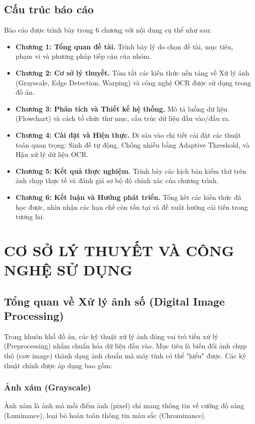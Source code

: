 \documentclass[6pt, a4paper]{report}
\begin{document}
	\section{Cấu trúc báo cáo}
	Báo cáo được trình bày trong 6 chương với nội dung cụ thể như sau:
	\begin{itemize}
		\item \textbf{Chương 1: Tổng quan đề tài.} Trình bày lý do chọn đề tài, mục tiêu, phạm vi và phương pháp tiếp cận của nhóm.
		\item \textbf{Chương 2: Cơ sở lý thuyết.} Tóm tắt các kiến thức nền tảng về Xử lý ảnh (Grayscale, Edge Detection, Warping) và công nghệ OCR được sử dụng trong đồ án.
		\item \textbf{Chương 3: Phân tích và Thiết kế hệ thống.} Mô tả luồng dữ liệu (Flowchart) và cách tổ chức thư mục, cấu trúc dữ liệu đầu vào/đầu ra.
		\item \textbf{Chương 4: Cài đặt và Hiện thực.} Đi sâu vào chi tiết cài đặt các thuật toán quan trọng: Sinh đề tự động, Chống nhiễu bằng Adaptive Threshold, và Hậu xử lý dữ liệu OCR.
		\item \textbf{Chương 5: Kết quả thực nghiệm.} Trình bày các kịch bản kiểm thử trên ảnh chụp thực tế và đánh giá sơ bộ độ chính xác của chương trình.
		\item \textbf{Chương 6: Kết luận và Hướng phát triển.} Tổng kết các kiến thức đã học được, nhìn nhận các hạn chế còn tồn tại và đề xuất hướng cải tiến trong tương lai.
	\end{itemize}
	
	\chapter{CƠ SỞ LÝ THUYẾT VÀ CÔNG NGHỆ SỬ DỤNG}
	
	\section{Tổng quan về Xử lý ảnh số (Digital Image Processing)}
	Trong khuôn khổ đồ án, các kỹ thuật xử lý ảnh đóng vai trò tiền xử lý (Preprocessing) nhằm chuẩn hóa dữ liệu đầu vào. Mục tiêu là biến đổi ảnh chụp thô (raw image) thành dạng ảnh chuẩn mà máy tính có thể "hiểu" được. Các kỹ thuật chính được áp dụng bao gồm:
	
	\subsection{Ảnh xám (Grayscale)}
	Ảnh xám là ảnh mà mỗi điểm ảnh (pixel) chỉ mang thông tin về cường độ sáng (Luminance), loại bỏ hoàn toàn thông tin màu sắc (Chrominance).
	
\end{document}
